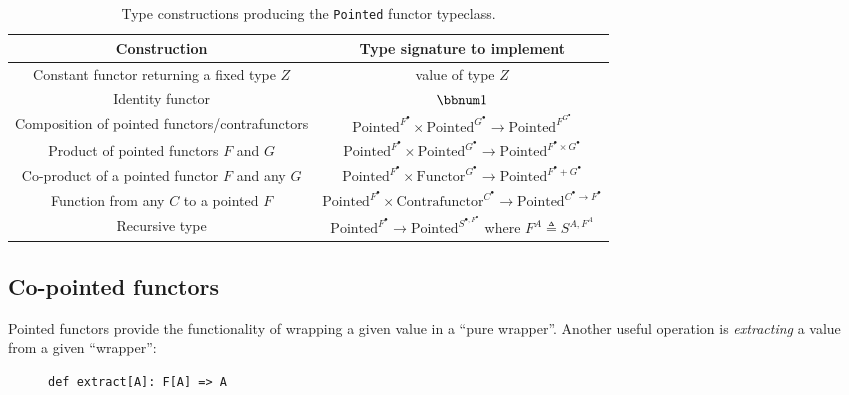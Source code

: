 \begin{table}
\begin{centering}
\begin{tabular}{|c|c|}
\hline 
\textbf{\footnotesize{}Construction} & \textbf{\footnotesize{}Type signature to implement}\tabularnewline
\hline 
\hline 
{\footnotesize{}Constant functor returning a fixed type $Z$} & {\footnotesize{}value of type $Z$}\tabularnewline
\hline 
{\footnotesize{}Identity functor} & {\footnotesize{}$\bbnum 1$}\tabularnewline
\hline 
{\footnotesize{}Composition of pointed functors/contrafunctors} & {\footnotesize{}$\text{Pointed}^{F^{\bullet}}\times\text{Pointed}^{G^{\bullet}}\rightarrow\text{Pointed}^{F^{G^{\bullet}}}$}\tabularnewline
\hline 
{\footnotesize{}Product of pointed functors $F$ and $G$} & {\footnotesize{}$\text{Pointed}^{F^{\bullet}}\times\text{Pointed}^{G^{\bullet}}\rightarrow\text{Pointed}^{F^{\bullet}\times G^{\bullet}}$}\tabularnewline
\hline 
{\footnotesize{}Co-product of a pointed functor $F$ and any $G$} & {\footnotesize{}$\text{Pointed}^{F^{\bullet}}\times\text{Functor}^{G^{\bullet}}\rightarrow\text{Pointed}^{F^{\bullet}+G^{\bullet}}$}\tabularnewline
\hline 
{\footnotesize{}Function from any $C$ to a pointed $F$} & {\footnotesize{}$\text{Pointed}^{F^{\bullet}}\times\text{Contrafunctor}^{C^{\bullet}}\rightarrow\text{Pointed}^{C^{\bullet}\rightarrow F^{\bullet}}$}\tabularnewline
\hline 
{\footnotesize{}Recursive type} & {\footnotesize{}$\text{Pointed}^{F^{\bullet}}\rightarrow\text{Pointed}^{S^{\bullet,F^{\bullet}}}$
where $F^{A}\triangleq S^{A,F^{A}}$}\tabularnewline
\hline 
\end{tabular}
\par\end{centering}
\caption{Type constructions producing the \lstinline!Pointed! functor typeclass.\label{tab:Type-constructions-for-pointed-functor}}
\end{table}


\subsection{Co-pointed functors\label{subsec:Co-pointed-functors}}

Pointed functors provide the functionality of wrapping a given value
in a \textsf{``}pure wrapper\textsf{''}. Another useful operation is \emph{extracting}
a value from a given \textsf{``}wrapper\textsf{''}:

\begin{wrapfigure}{l}{0.5\columnwidth}%
\vspace{-0.8\baselineskip}
\begin{lstlisting}
def extract[A]: F[A] => A
\end{lstlisting}
\vspace{-0.5\baselineskip}
\end{wrapfigure}%

